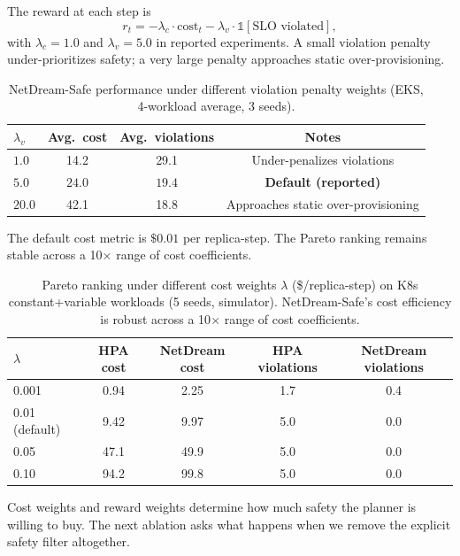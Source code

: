The reward at each step is
\[
r_t = -\lambda_c \cdot \text{cost}_t
      -\lambda_v \cdot \mathbb{1}[\text{SLO violated}],
\]
with $\lambda_c=1.0$ and $\lambda_v=5.0$ in reported experiments.  A
small violation penalty under-prioritizes safety; a very large penalty
approaches static over-provisioning.

\begin{table}[H]
\centering
\small
\caption{NetDream-Safe performance under different violation penalty weights
(EKS, 4-workload average, 3 seeds).}
\label{tab:reward-sensitivity}
\begin{tabular}{@{}lccc@{}}
\toprule
$\lambda_v$ & Avg.\ cost & Avg.\ violations & Notes \\
\midrule
$1.0$  & 14.2 & 29.1 & Under-penalizes violations \\
$\mathbf{5.0}$ & $\mathbf{24.0}$ & $\mathbf{19.4}$ & \textbf{Default (reported)} \\
$20.0$ & 42.1 & 18.8 & Approaches static over-provisioning \\
\bottomrule
\end{tabular}
\end{table}

The default cost metric is $\$0.01$ per replica-step.  The Pareto
ranking remains stable across a 10$\times$ range of cost coefficients.

\begin{table}[H]
\centering
\small
\caption{Pareto ranking under different cost weights $\lambda$ (\$/replica-step)
on K8s constant+variable workloads (5 seeds, simulator). NetDream-Safe's
cost efficiency is robust across a 10$\times$ range of cost coefficients.}
\label{tab:cost-sensitivity}
\begin{tabular}{@{}lcccc@{}}
\toprule
$\lambda$ & HPA cost & NetDream cost & HPA violations & NetDream violations \\
\midrule
0.001 & 0.94 & 2.25 & 1.7 & 0.4 \\
0.01 (default) & 9.42 & 9.97 & 5.0 & 0.0 \\
0.05 & 47.1 & 49.9 & 5.0 & 0.0 \\
0.10 & 94.2 & 99.8 & 5.0 & 0.0 \\
\bottomrule
\end{tabular}
\end{table}

Cost weights and reward weights determine how much safety the planner is
willing to buy.  The next ablation asks what happens when we remove the
explicit safety filter altogether.

